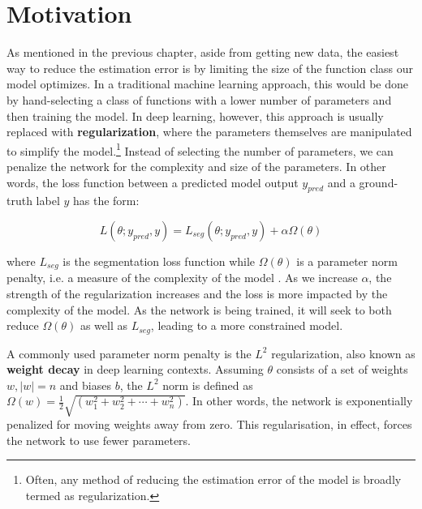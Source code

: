 





\section{Motivation}

As mentioned in the previous chapter, aside from getting new data, the easiest way to reduce the estimation error is by limiting the size of the function class our model optimizes. In a traditional machine learning approach, this would be done by hand-selecting a class of functions with a lower number of parameters and then training the model. In deep learning, however, this approach is usually replaced with \textbf{regularization}, where the parameters themselves are manipulated to simplify the model.\footnote{Often, any method of reducing the estimation error of the model is broadly termed as regularization.} Instead of selecting the number of parameters, we can penalize the network for the complexity and size of the parameters. In other words, the loss function between a predicted model output $y_{pred}$ and a ground-truth label $y$ has the form:

\begin{equation}
	L(\theta; y_{pred}, y) = L_{seg}(\theta; y_{pred}, y) + \alpha\Omega(\theta)
\end{equation}

where $L_{seg}$ is the segmentation loss function while $\Omega(\theta)$ is a parameter norm penalty, i.e. a measure of the complexity of the model \cite{goodfellowDeepLearning2016}. As we increase $\alpha$, the strength of the regularization increases and the loss is more impacted by the complexity of the model. As the network is being trained, it will seek to both reduce $\Omega(\theta)$ as well as $L_{seg}$, leading to a more constrained model.

A commonly used parameter norm penalty is the $L^2$ regularization, also known as \textbf{weight decay} in deep learning contexts. Assuming $\theta$ consists of a set of weights $w, \lvert w \rvert = n$ and biases $b$, the $L^2$ norm is defined as $\Omega(w) = \frac{1}{2}\sqrt{(w_1^2 + w_2^2 + \cdots + w_n^2)}$. In other words, the network is exponentially penalized for moving weights away from zero. This regularisation, in effect, forces the network to use fewer parameters.

